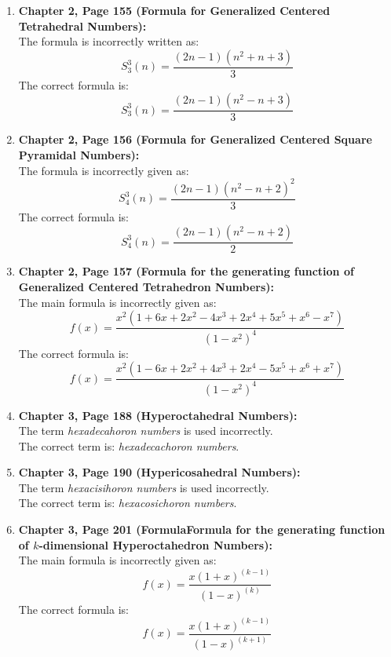 \documentclass[10pt, a4paper]{article}
\begin{document}
\begin{enumerate}
    \item \textbf{Chapter 2, Page 155 (Formula for Generalized Centered Tetrahedral Numbers):} \\
          The formula is incorrectly written as:
          \[
              S_3^3(n) = \frac{(2n - 1)(n^2 + n + 3)}{3}
          \]
          The correct formula is:
          \[
              S_3^3(n) = \frac{(2n - 1)(n^2 - n + 3)}{3}
          \]

    \item \textbf{Chapter 2, Page 156 (Formula for Generalized Centered Square Pyramidal Numbers):} \\
          The formula is incorrectly given as:
          \[
              S_4^3(n) = \frac{(2n - 1)(n^2 - n + 2)^2}{3}
          \]
          The correct formula is:
          \[
              S_4^3(n) = \frac{(2n - 1)(n^2 - n + 2)}{2}
          \]
    \item \textbf{Chapter 2, Page 157 (Formula for the generating function of Generalized Centered Tetrahedron Numbers):} \\
          The main formula is incorrectly given as:
          \[
              f(x)  = \frac{x^2 \left(1 + 6x + 2x^2 - 4x^3 + 2x^4 + 5x^5 + x^6 - x^7 \right)}{(1 - x^2)^4}
          \]
          The correct formula is:
          \[
              f(x) = \frac{x^2 \left(1 - 6x + 2x^2 + 4x^3 + 2x^4 - 5x^5 + x^6 + x^7 \right)}{(1 - x^2)^4}
          \]
    \item \textbf{Chapter 3, Page 188 (Hyperoctahedral Numbers):} \\
          The term \emph{hexadecahoron numbers} is used incorrectly. \\
          The correct term is: \emph{hexadecachoron numbers}.

    \item \textbf{Chapter 3, Page 190 (Hypericosahedral Numbers):} \\
          The term \emph{hexacisihoron numbers} is used incorrectly. \\
          The correct term is: \emph{hexacosichoron numbers}.


    \item \textbf{Chapter 3, Page 201 (FormulaFormula for the generating function of $k$-dimensional Hyperoctahedron Numbers):} \\
          The main formula is incorrectly given as:
          \[
              f(x) = \frac{x  (1 + x)^{(k - 1)} } {(1 - x)^{(k)}}
          \]
          The correct formula is:
          \[
              f(x) = \frac{x  (1 + x)^{(k - 1)} } {(1 - x)^{(k + 1)}}
          \]
\end{enumerate}
\end{document}
